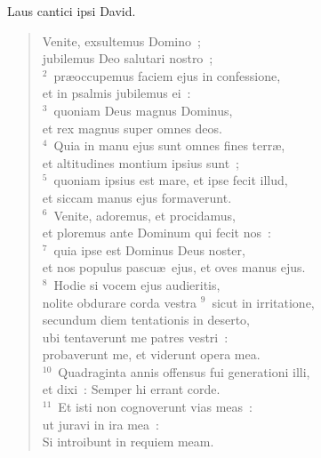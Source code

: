 \lettrine[lines=3,image=true,loversize=0.05,lraise=-0.03]{L}{}aus cantici ipsi David. \begin{flushleft}\begin{verse}\vspace{6pt}Venite, exsultemus Domino~;\\ jubilemus Deo salutari nostro~;\\
${}^{2}$~pr\ae occupemus faciem ejus in confessione,\\ et in psalmis jubilemus ei~:\\
${}^{3}$~quoniam Deus magnus Dominus,\\ et rex magnus super omnes deos.\\
${}^{4}$~Quia in manu ejus sunt omnes fines terr\ae ,\\ et altitudines montium ipsius sunt~;\\
${}^{5}$~quoniam ipsius est mare, et ipse fecit illud,\\ et siccam manus ejus formaverunt.\\
${}^{6}$~Venite, adoremus, et procidamus,\\ et ploremus ante Dominum qui fecit nos~:\\
${}^{7}$~quia ipse est Dominus Deus noster,\\ et nos populus pascu\ae\ ejus, et oves manus ejus.\\
${}^{8}$~Hodie si vocem ejus audieritis,\\ nolite obdurare corda vestra
${}^{9}$~sicut in irritatione,\\ secundum diem tentationis in deserto,\\ ubi tentaverunt me patres vestri~:\\ probaverunt me, et viderunt opera mea.\\
${}^{10}$~Quadraginta annis offensus fui generationi illi,\\ et dixi~: Semper hi errant corde.\\
${}^{11}$~Et isti non cognoverunt vias meas~:\\ ut juravi in ira mea~:\\ Si introibunt in requiem meam.\end{verse}\end{flushleft}



